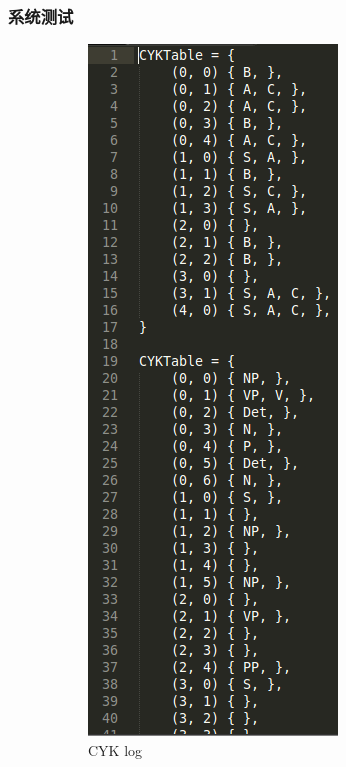 \documentclass{beamer}
\begin{document}
 \begin{frame}
   \frametitle{系统测试}
\begin{figure}
    \centering
    \begin{subfigure}[b]{0.3\textwidth}
        \includegraphics[height=0.75\textheight]{LogCYK.png}
        \caption{CYK log}
        \label{fig:cyk}
    \end{subfigure}
    ~ %
    \begin{subfigure}[b]{0.3\textwidth}

\end{subfigure}
\end{figure}
\end{frame}
\end{document}
